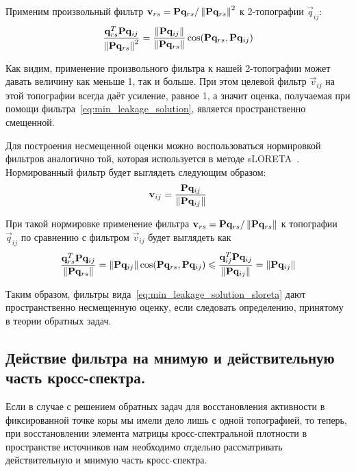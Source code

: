 Применим произвольный фильтр $\mathbf{v}_{rs} = \mathbf{P} \mathbf{q}_{rs} / \left\lVert\mathbf{P} \mathbf{q}_{rs}\right\rVert^2$ к
2-топографии $\vec{q}_{ij}$:
\begin{equation}
    \frac{\mathbf{q}_{rs}^T\mathbf{P} \mathbf{q}_{ij}}{\left\lVert\mathbf{P}\mathbf{q}_{rs}\right\rVert^2} =
    \frac{
        \left\lVert\mathbf{P} \mathbf{q}_{ij}\right\rVert
    }{
        \left\lVert\mathbf{P}\mathbf{q}_{rs}\right\rVert
    }
    \cos(\mathbf{P}\mathbf{q}_{rs}, \mathbf{P} \mathbf{q}_{ij})
\end{equation}

Как видим, применение произвольного фильтра к нашей 2-топографии может давать
величину как меньше 1, так и больше.  При этом целевой фильтр $\vec{v}_{ij}$ на
этой топографии всегда даёт усиление, равное 1, а значит оценка, получаемая при
помощи фильтра~\ref{eq:min_leakage_solution}, является пространственно
смещенной.

Для построения несмещенной оценки можно воспользоваться нормировкой фильтров аналогично той, которая
используется в методе sLORETA~\cite{Pascual-Marqui2002}. Нормированный фильтр будет выглядеть следующим образом:
\begin{equation}
    \mathbf{v}_{ij} = \frac{\mathbf{P} \mathbf{q}_{ij}}{\left\lVert\mathbf{P} \mathbf{q}_{ij}\right\rVert}
    \label{eq:min_leakage_solution_sloreta}
\end{equation}

При такой нормировке применение фильтра $\mathbf{v}_{rs} = \mathbf{P} \mathbf{q}_{rs} / \left\lVert\mathbf{P} \mathbf{q}_{rs}\right\rVert$
к топографии $\vec{q}_{ij}$ по сравнению с фильтром $\vec{v}_{ij}$ будет выглядеть как
\begin{equation}
    \frac{\mathbf{q}_{rs}^T\mathbf{P} \mathbf{q}_{ij}}{\left\lVert\mathbf{P}\mathbf{q}_{rs}\right\rVert} =
    \left\lVert\mathbf{P} \mathbf{q}_{ij}\right\rVert \cos(\mathbf{P}\mathbf{q}_{rs}, \mathbf{P} \mathbf{q}_{ij}) \leqslant
    \frac{\mathbf{q}_{ij}^T\mathbf{P} \mathbf{q}_{ij}}{\left\lVert\mathbf{P}\mathbf{q}_{ij}\right\rVert} =
    \left\lVert\mathbf{P} \mathbf{q}_{ij}\right\rVert
\end{equation}

Таким образом, фильтры вида~\ref{eq:min_leakage_solution_sloreta} дают
пространственно несмещенную оценку, если следовать определению, принятому в
теории обратных задач.

\subsection{Действие фильтра на мнимую и действительную часть кросс-спектра.}

Если в случае с решением обратных задач для восстановления активности в
фиксированной точке коры мы имели дело лишь с одной топографией, то теперь, при
восстановлении элемента матрицы кросс-спектральной плотности в пространстве
источников нам необходимо отдельно рассматривать действительную и мнимую часть
кросс-спектра.

